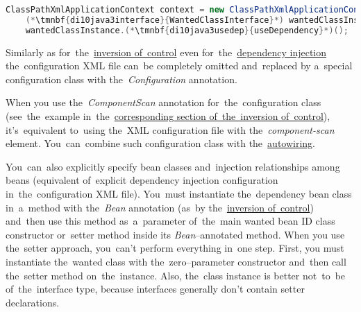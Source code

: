 \begin{lstlisting}[language=Java, title={Usage}]
    ClassPathXmlApplicationContext context = new ClassPathXmlApplicationContext("configurationFile.xml");
    (*\tmnbf{di10java3interface}{WantedClassInterface}*) wantedClassInstance = context.getBean("(*\tmnbf{di10java3beanid}{wantedClass}[ForestGreen]*)", (*\tmnbf{di10java3interface2}{WantedClassInterface}*).class);
    wantedClassInstance.(*\tmnbf{di10java3usedep}{useDependency}*)();
\end{lstlisting}
\newpage

Similarly as for~the~\hyperref[springinversionofcontrol]{inversion of~control} even for~the~\hyperref[springdependencyinjection]{dependency injection} the~configuration XML file can~be completely omitted and~replaced by a~special configuration class with the~\textit{Configuration} annotation.

When you use the~\textit{ComponentScan} annotation for~the~configuration class (see~the~example in~the~\hyperref[iocnoxml]{corresponding section of~the~inversion of~control}), it's~equivalent to~using the~XML configuration file with the~\textit{component-scan} element.
You~can~combine such configuration class with the~\hyperref[autowiring]{autowiring}.

You~can~also explicitly specify bean classes and~injection relationships among beans (equivalent of~explicit dependency injection configuration in~the~configuration XML file).
You~must instantiate the~dependency bean class in~a~method with the~\textit{Bean} annotation (as~by the~\hyperref[iocnoxml]{inversion of~control}) and~then use this method as~a~parameter of~the~main wanted bean ID class constructor or~setter method inside its \textit{Bean}--annotated method.
When you use the~setter approach, you~can't perform everything in~one step.
First, you must instantiate the~wanted class with the~zero--parameter constructor and~then call the~setter method on~the~instance.
Also, the~class instance is better not~to~be of~the~interface type, because interfaces generally don't contain setter declarations.

